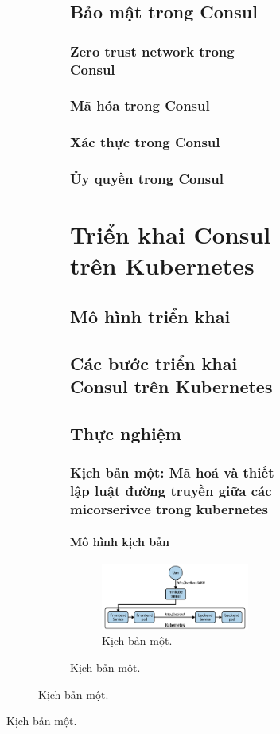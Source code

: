 \documentclass[12pt,a4paper]{report}
\begin{document}
\begin{figure}[h]
\begin{figure}[h]
\begin{figure}[h]
	\hspace{0.3cm}{Cuốn sách này tập trung vào các tính năng service mesh của Consul, nhưng bạn có thể truy cập tài liệu của Consul để tìm hiểu thêm về các tính năng khác của nó.}
	\section{Bảo mật trong Consul}
	\subsection{Zero trust network trong Consul}
	\subsection{Mã hóa trong Consul}
	\subsection{Xác thực trong Consul}
	\subsection{Ủy quyền trong Consul}
	\chapter{Triển khai Consul trên Kubernetes}
	\section{Mô hình triển khai}
	\section{Các bước triển khai Consul trên Kubernetes}
	\section{Thực nghiệm}
	\subsection{Kịch bản một: Mã hoá và thiết lập luật đường truyền giữa các micorserivce trong kubernetes}
	\subsubsection{Mô hình kịch bản}
	 \begin{figure}[h]
		\centering
		\includegraphics[width=0.7\linewidth]{Pics/kb1}
		\caption{\label{fig:kb1} Kịch bản một.}
		\label{fig:kb1}
	\end{figure}
	

\end{figure}
\end{figure}
\end{figure}
\end{document}
